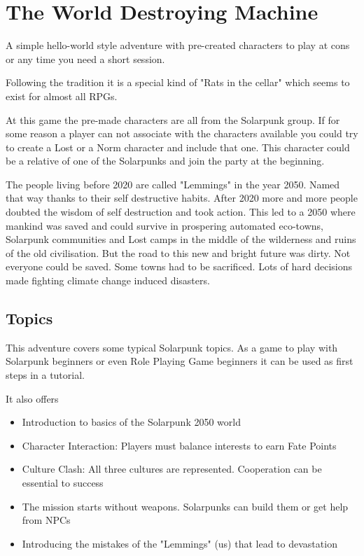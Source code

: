 \chapter{The World Destroying Machine}
\label{ch:the world destroying machine}

A simple hello-world style adventure with pre-created characters to play at cons or any time you need a short session.

Following the tradition it is a special kind of "Rats in the cellar" which seems to exist for almost all RPGs.

At this game the pre-made characters are all from the Solarpunk group. If for some reason a player can not associate with the characters available you could try to create a Lost or a Norm character and include that one. This character could be a relative of one of the Solarpunks and join the party at the beginning.

\begin{sidebarBox}[title=Dirty Road to Eden]

The people living before 2020 are called "Lemmings" in the year 2050. Named that way thanks to their self destructive habits. After 2020 more and more people doubted the wisdom of self destruction and took action. This led to a 2050 where mankind was saved and could survive in prospering automated eco-towns, Solarpunk communities and Lost camps in the middle of the wilderness and ruins of the old civilisation. But the road to this new and bright future was dirty. Not everyone could be saved. Some towns had to be sacrificed. Lots of hard decisions made fighting climate change induced disasters. 

\end{sidebarBox}

\section{Topics}

This adventure covers some typical Solarpunk topics. As a game to play with Solarpunk beginners or even Role Playing Game beginners it can be used as first steps in a tutorial.

It also offers

\begin{itemize}
\item Introduction to basics of the Solarpunk 2050 world
\item Character Interaction: Players must balance interests to earn Fate Points
\item Culture Clash: All three cultures are represented. Cooperation can be essential to success
\item The mission starts without weapons. Solarpunks can build them or get help from NPCs
\item Introducing the mistakes of the "Lemmings" (us) that lead to devastation
\end{itemize}


